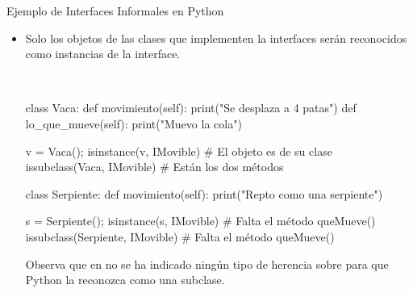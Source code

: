 \documentclass[10pt, envcountsect , spanish]{beamer}
\begin{document}
\begin{frame}[fragile]{Ejemplo de Interfaces Informales en Python} 
\begin{itemize}

\item Solo los objetos de las clases que implementen la interfaces serán reconocidos como instancias de la interface.

\

\scriptsize
\begin{pyconsole}[][frame=single, fontsize=\scriptsize]
class Vaca:
    def movimiento(self):
        print("Se desplaza a 4 patas")
    def lo_que_mueve(self):
        print("Muevo la cola")

v = Vaca(); isinstance(v, IMovible)  # El objeto es de su clase
issubclass(Vaca, IMovible) # Están los dos métodos 

class Serpiente:
    def movimiento(self):
        print("Repto como una serpiente")   
                 
s = Serpiente(); isinstance(s, IMovible) # Falta el método queMueve()
issubclass(Serpiente, IMovible) # Falta el método queMueve()
\end{pyconsole}


Observa que en  no se ha indicado ningún tipo de herencia sobre  para que Python la reconozca como una  subclase.
\end{itemize}

\end{frame}
\end{document}
